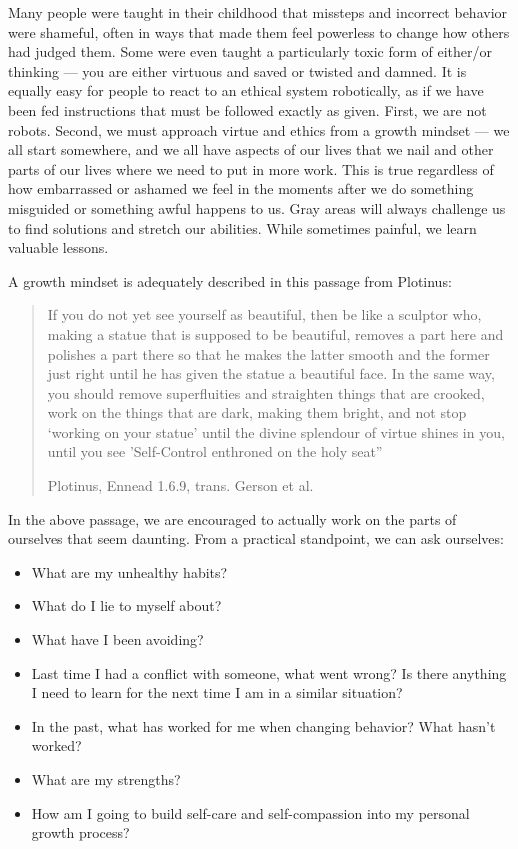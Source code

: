 \documentclass[
]{book}
\providecommand{\tightlist}{%
  \setlength{\itemsep}{0pt}\setlength{\parskip}{0pt}}
\begin{document}
Many people were taught in their childhood that missteps and incorrect behavior were shameful, often in ways that made them feel powerless to change how others had judged them. Some were even taught a particularly toxic form of either/or thinking --- you are either virtuous and saved or twisted and damned. It is equally easy for people to react to an ethical system robotically, as if we have been fed instructions that must be followed exactly as given. First, we are not robots. Second, we must approach virtue and ethics from a growth mindset --- we all start somewhere, and we all have aspects of our lives that we nail and other parts of our lives where we need to put in more work. This is true regardless of how embarrassed or ashamed we feel in the moments after we do something misguided or something awful happens to us. Gray areas will always challenge us to find solutions and stretch our abilities. While sometimes painful, we learn valuable lessons.

A growth mindset is adequately described in this passage from Plotinus:

\begin{quote}
If you do not yet see yourself as beautiful, then be like a sculptor who, making a statue that is supposed to be beautiful, removes a part here and polishes a part there so that he makes the latter smooth and the former just right until he has given the statue a beautiful face. In the same way, you should remove superfluities and straighten things that are crooked, work on the things that are dark, making them bright, and not stop `working on your statue' until the divine splendour of virtue shines in you, until you see 'Self-Control enthroned on the holy seat''

Plotinus, Ennead 1.6.9, trans. Gerson et al.
\end{quote}

In the above passage, we are encouraged to actually work on the parts of ourselves that seem daunting. From a practical standpoint, we can ask ourselves:

\begin{itemize}
\tightlist
\item
  What are my unhealthy habits?
\item
  What do I lie to myself about?
\item
  What have I been avoiding?
\item
  Last time I had a conflict with someone, what went wrong? Is there anything I need to learn for the next time I am in a similar situation?
\item
  In the past, what has worked for me when changing behavior? What hasn't worked?
\item
  What are my strengths?
\item
  How am I going to build self-care and self-compassion into my personal growth process?
\end{itemize}
\end{document}
